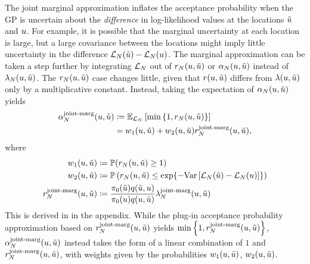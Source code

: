 \documentclass[12pt]{article}
\begin{document}
The joint marginal approximation inflates the acceptance probability when the GP is uncertain about the 
\textit{difference} in log-likelihood values at the locations $\propPar$ and $\Par$. For example, it is possible
that the marginal uncertainty at each location is large, but a large covariance between the locations 
might imply little uncertainty in the difference $\llikEm[\Ndesign](\propPar) - \llikEm[\Ndesign](\Par)$. The 
marginal approximation can be taken a step further by integrating $\llikEm$ out of 
$\Em[\Ndesign]{\accProbRatio}(\Par, \propPar)$ or $\Em[\Ndesign]{\accProbMH}(\Par, \propPar)$ instead of 
$\Em[\Ndesign]{\likRatio}(\Par, \propPar)$. The $\Em[\Ndesign]{\accProbRatio}(\Par, \propPar)$ case changes 
little, given that $\accProbRatio(\Par, \propPar)$ differs from $\likRatio(\Par, \propPar)$ only by a multiplicative 
constant. Instead, taking the expectation of $\Em[\Ndesign]{\accProbMH}(\Par, \propPar)$ yields 
\begin{align}
\llikEmJointMarg[\Ndesign]{\accProbMH}(\Par, \propPar) 
&\Def \E_{\llikEm[\Ndesign]} \left[\min\left\{1, \Em[\Ndesign]{\accProbRatio}(\Par, \propPar)\right\} \right] \\
&= w_1(\Par, \propPar) + w_2(\Par, \propPar) \llikEmJointMarg[\Ndesign]{\accProbRatio}(\Par, \propPar),
\label{acc_prob_joint_marg}
\end{align} 
where 
\begin{align*}
w_1(\Par, \propPar) &\Def \Prob(\Em[\Ndesign]{\accProbRatio}(\Par, \propPar) \geq 1) \\
w_2(\Par, \propPar) &\Def \Prob\left(\Em[\Ndesign]{\accProbRatio}(\Par, \propPar) \leq \Exp{-\Var\left[\llikEm[\Ndesign](\propPar) - \llikEm[\Ndesign](\Par) \right]}\right) \\
\llikEmJointMarg[\Ndesign]{\accProbRatio}(\Par, \propPar) 
&\Def \frac{\priorDens(\propPar) \propDens(\propPar, \Par)}{\priorDens(\Par) \propDens(\Par, \propPar)} 
\llikEmJointMarg[\Ndesign]{\likRatio}(\Par, \propPar)
\end{align*}
This is derived in  in the appendix. While the plug-in acceptance probability 
approximation based on $\llikEmJointMarg[\Ndesign]{\accProbRatio}(\Par, \propPar)$ yields 
$\min\left\{1, \llikEmJointMarg[\Ndesign]{\accProbRatio}(\Par, \propPar) \right\}$, 
$\llikEmJointMarg[\Ndesign]{\accProbMH}(\Par, \propPar)$ instead takes the form of a linear combination of 
$1$ and $\llikEmJointMarg[\Ndesign]{\accProbRatio}(\Par, \propPar)$, with weights given by the probabilities 
$w_1(\Par, \propPar)$, $w_2(\Par, \propPar)$.
\end{document}
